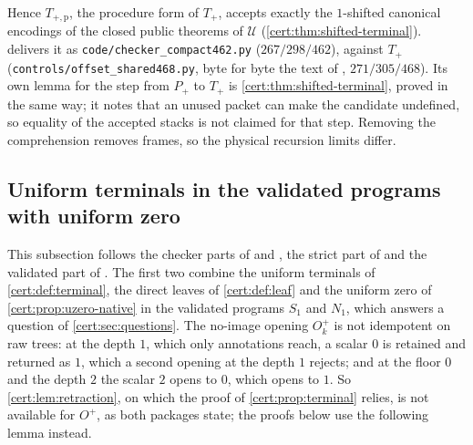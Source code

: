 Hence $T_{+,\mathrm p}$, the procedure form of $T_{+}$, accepts exactly the
$1$-shifted canonical encodings of the closed public theorems of $\mathcal U$
(\cref{cert:thm:shifted-terminal}).  delivers it as
\texttt{code/checker\_compact462.py} ($267/298/462$), against $T_{+}$
(\texttt{controls/offset\_shared468.py}, byte for byte the text of
, $271/305/468$). Its own lemma for the step from $P_{+}$
to $T_{+}$ is \cref{cert:thm:shifted-terminal}, proved in the same way; it notes
that an unused packet can make the candidate undefined, so equality of the
accepted stacks is not claimed for that step. Removing the comprehension
removes frames, so the physical recursion limits differ.

\subsection{Uniform terminals in the validated programs with uniform zero}\label{cert:sec:validated-terminal}

This subsection follows the checker parts of  and
, the strict part of  and the
validated part of . The
first two combine the uniform terminals of
\cref{cert:def:terminal}, the direct leaves of \cref{cert:def:leaf} and the
uniform zero of \cref{cert:prop:uzero-native} in the validated programs $S_1$
and $N_1$, which answers a question of \cref{cert:sec:questions}. The no-image
opening $O^{+}_k$ is not idempotent on raw trees: at the depth $1$, which only
annotations reach, a scalar $0$ is retained and returned as $1$, which a
second opening at the depth $1$ rejects; and at the floor $0$ and the depth $2$
the scalar $2$ opens to $0$, which opens to $1$. So \cref{cert:lem:retraction},
on which the proof of \cref{cert:prop:terminal} relies, is not available for
$O^{+}$, as both packages state; the proofs below use the following lemma
instead.

